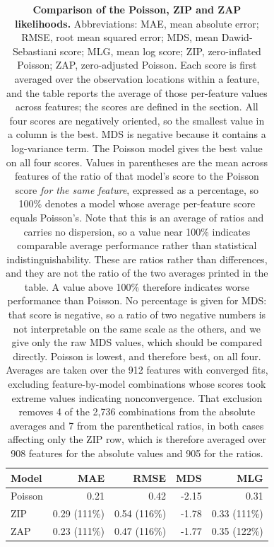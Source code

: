 \documentclass[10pt,letterpaper]{article}
\begin{document}
\begin{table}[!ht]
\centering
\caption{{\bf Comparison of the Poisson, ZIP and ZAP likelihoods.} Abbreviations: MAE, mean absolute error; RMSE, root mean squared error; MDS, mean Dawid-Sebastiani score; MLG, mean log score; ZIP, zero-inflated Poisson; ZAP, zero-adjusted Poisson. Each score is first averaged over the observation locations within a feature, and the table reports the average of those per-feature values across features; the scores are defined in the  section. All four scores are negatively oriented, so the smallest value in a column is the best. MDS is negative because it contains a log-variance term. The Poisson model gives the best value on all four scores. Values in parentheses are the mean across features of the ratio of that model's score to the Poisson score \emph{for the same feature}, expressed as a percentage, so 100\% denotes a model whose average per-feature score equals Poisson's. Note that this is an average of ratios and carries no dispersion, so a value near 100\% indicates comparable average performance rather than statistical indistinguishability. These are ratios rather than differences, and they are not the ratio of the two averages printed in the table. A value above 100\% therefore indicates worse performance than Poisson. No percentage is given for MDS: that score is negative, so a ratio of two negative numbers is not interpretable on the same scale as the others, and we give only the raw MDS values, which should be compared directly. Poisson is lowest, and therefore best, on all four. Averages are taken over the 912 features with converged fits, excluding feature-by-model combinations whose scores took extreme values indicating nonconvergence. That exclusion removes 4 of the 2,736 combinations from the absolute averages and 7 from the parenthetical ratios, in both cases affecting only the ZIP row, which is therefore averaged over 908 features for the absolute values and 905 for the ratios.}
\label{tab:lik-comp}
\begin{tabular}{|l|rrrr|}
  \hline
  Model & MAE & RMSE & MDS & MLG \\
  \hline
Poisson & 0.21 & 0.42 & -2.15 & 0.31 \\
ZIP & 0.29 (111\%) & 0.54 (116\%) & -1.78 & 0.33 (111\%) \\
ZAP & 0.23 (111\%)& 0.47 (116\%)& -1.77 & 0.35 (122\%)\\
   \hline
\end{tabular}
\end{table}
\end{document}
